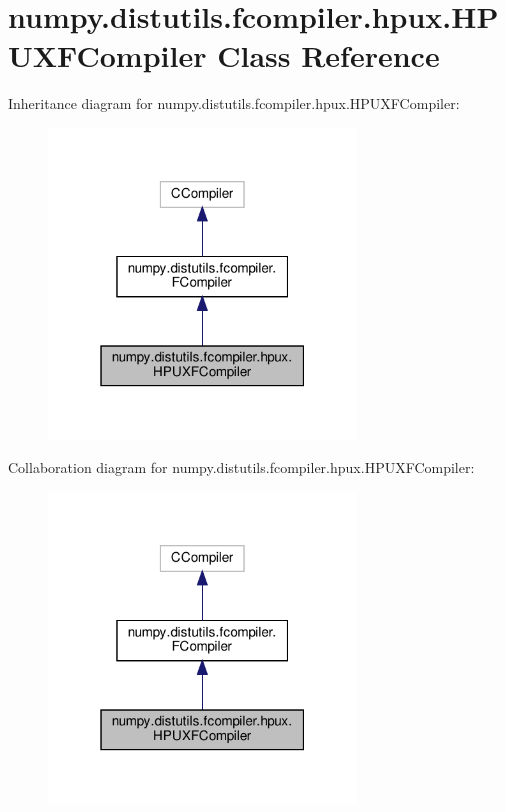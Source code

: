 \hypertarget{classnumpy_1_1distutils_1_1fcompiler_1_1hpux_1_1HPUXFCompiler}{}\section{numpy.\+distutils.\+fcompiler.\+hpux.\+H\+P\+U\+X\+F\+Compiler Class Reference}
\label{classnumpy_1_1distutils_1_1fcompiler_1_1hpux_1_1HPUXFCompiler}


Inheritance diagram for numpy.\+distutils.\+fcompiler.\+hpux.\+H\+P\+U\+X\+F\+Compiler\+:
\nopagebreak
\begin{figure}[H]
\begin{center}
\leavevmode
\includegraphics[width=232pt]{classnumpy_1_1distutils_1_1fcompiler_1_1hpux_1_1HPUXFCompiler__inherit__graph}
\end{center}
\end{figure}


Collaboration diagram for numpy.\+distutils.\+fcompiler.\+hpux.\+H\+P\+U\+X\+F\+Compiler\+:
\nopagebreak
\begin{figure}[H]
\begin{center}
\leavevmode
\includegraphics[width=232pt]{classnumpy_1_1distutils_1_1fcompiler_1_1hpux_1_1HPUXFCompiler__coll__graph}
\end{center}
\end{figure}
